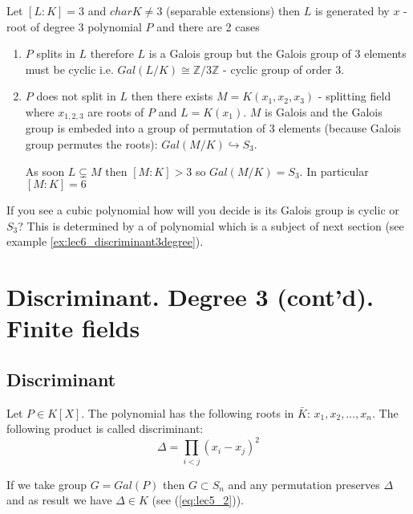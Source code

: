 \begin{example}[Degree 3]
    Let $\left[L:K\right] = 3$ and $char K \ne 3$ (separable
    extensions) then $L$ is generated by $x$ - root of 
    degree 3 polynomial $P$ and there are 2 cases
    \begin{enumerate}
    \item $P$ splits in $L$ therefore $L$ is a Galois group but the
      Galois group of 3 elements must be cyclic i.e.
      $Gal\left(L/K\right) \cong \mathbb{Z}/3\mathbb{Z}$ - cyclic
      group of order 3.
    \item $P$ does not split in $L$ then there exists
      $M = K\left(x_1, x_2, x_3\right)$ - splitting field where
      $x_{1,2,3}$ are roots of $P$ and $L = K\left(x_1\right)$. $M$ is
      Galois and the Galois group is embeded into a group of
      permutation of 3 elements (because Galois group permutes the roots):
      $Gal\left(M/K\right) \hookrightarrow S_3$.

      As soon $L \subsetneq M$ then $\left[M:K\right] > 3$ so
      $Gal\left(M/K\right) = S_3$. In particular
      $\left[M:K\right] = 6$
    \end{enumerate}

    If you see a cubic polynomial how will you decide is its Galois
    group is cyclic or $S_3$? This is determined by a
     of polynomial which is a subject of
    next section (see example \ref{ex:lec6_discriminant3degree}).

    \label{ex:lec6_degree3}
\end{example}

\section{Discriminant. Degree 3 (cont'd). Finite fields}

\subsection{Discriminant}

\begin{definition}[discriminant]
  Let $P \in K\left[X\right]$. The polynomial has the following roots
  in $\bar{K}$: $x_1, x_2, \dots, x_n$. The following product is
  called discriminant:
  \[
  \Delta = \prod_{i < j} \left(x_i - x_j\right)^2
  \]
  \label{def:discriminant}
\end{definition}

If we take group $G = Gal\left(P\right)$ then
$G \subset S_n$ and any permutation preserves $\Delta$ and as result
we have $\Delta \in K$ (see (\ref{eq:lec5_2})).

